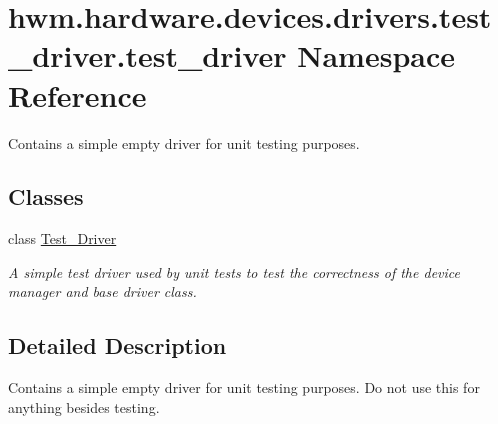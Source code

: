 \hypertarget{namespacehwm_1_1hardware_1_1devices_1_1drivers_1_1test__driver_1_1test__driver}{\section{hwm.\-hardware.\-devices.\-drivers.\-test\-\_\-driver.\-test\-\_\-driver Namespace Reference}
\label{namespacehwm_1_1hardware_1_1devices_1_1drivers_1_1test__driver_1_1test__driver}
}


Contains a simple empty driver for unit testing purposes.  


\subsection*{Classes}
\begin{DoxyCompactItemize}
\item 
class \hyperlink{classhwm_1_1hardware_1_1devices_1_1drivers_1_1test__driver_1_1test__driver_1_1_test___driver}{Test\-\_\-\-Driver}
\begin{DoxyCompactList}\small\item\em A simple test driver used by unit tests to test the correctness of the device manager and base driver class. \end{DoxyCompactList}\end{DoxyCompactItemize}


\subsection{Detailed Description}
Contains a simple empty driver for unit testing purposes. Do not use this for anything besides testing. 
